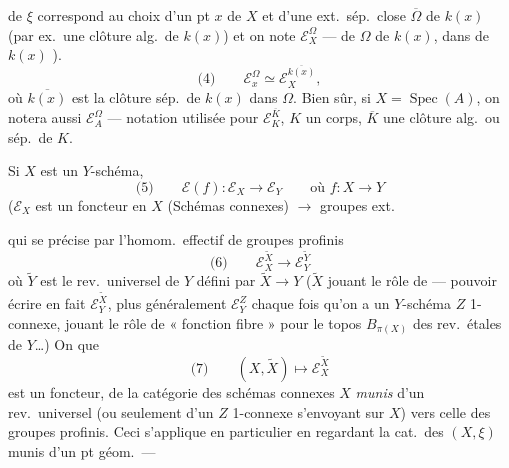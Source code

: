 \documentclass[11pt,a4paper]{article}
\begin{document}
de $\xi$ correspond au choix d'un pt $x$ de $X$
et d'une ext.\ sép.\ close $\overline{\Omega}$ de $k(x)$
(par ex.\ une clôture alg.\ de $k(x)$) et on
note  \quad $\mathcal{E}^{\Omega}_{X}$ ---  de
  \ill{} \ill{} $\Omega$
 de $k(x)$, dans  
\add{\uncertain{\ill{} \ill{}}}
de $k(x)$ ).  
\[
\text{(4)} \qquad \mathcal{E}^{\Omega}_{x} \simeq \mathcal{E}^{\overline{k(x)}}_{X} ,
\]
où $\overline{k(x)}$ est la clôture sép.\ de $k(x)$ dans
$\Omega$. Bien sûr, si $X = \operatorname{Spec}(A)$, on
notera aussi \quad $\mathcal{E}^{\Omega}_{A}$ --- notation 
utilisée pour \quad $\mathcal{E}^{\overline{K}}_{K}$, $K$ un corps,
$\overline{K}$ une clôture alg.\ ou sép.\ de $K$.

Si $X$ est un $Y$-schéma,  
\[
\text{(5)} \qquad \mathcal{E}(f) : \mathcal{E}_X \longrightarrow \mathcal{E}_Y \qquad \text{où } f : X \to Y
\]
($\mathcal{E}_X$ est un foncteur en $X$
(Schémas connexes) $\longrightarrow$ groupes ext.

qui se précise par l'homom.\ effectif de groupes
profinis
\[
\text{(6)} \qquad \mathcal{E}^{\tilde{X}}_{X} \longrightarrow \mathcal{E}^{\tilde{Y}}_{Y}
\]
où $\tilde{Y}$ est le rev.\ universel de $Y$ défini
par $\tilde{X} \to Y$ ($\tilde{X}$ jouant le rôle de
 --- \struck{\ill{}}  pouvoir écrire en
fait $\mathcal{E}^{\tilde{X}}_{Y}$, plus généralement $\mathcal{E}^{Z}_{Y}$ chaque fois
qu'on a un $Y$-schéma $Z$ 1-connexe,
jouant le rôle de « fonction fibre » pour
le topos $B_{\pi(X)}$ des rev.\ étales de $Y$…)
On   que
\[
\text{(7)} \qquad (X, \tilde{X}) \longmapsto \mathcal{E}^{\tilde{X}}_{X}
\]
est un foncteur, de la catégorie des
schémas connexes $X$ \emph{munis} d'un
rev.\ universel (ou seulement d'un
$Z$ 1-connexe s'envoyant sur $X$) vers
celle des groupes profinis. Ceci s'applique
\add{\uncertain{\ill{}}}
en particulier en regardant la cat.\
des $(X, \xi)$ munis d'un pt géom.\ ---
\end{document}
